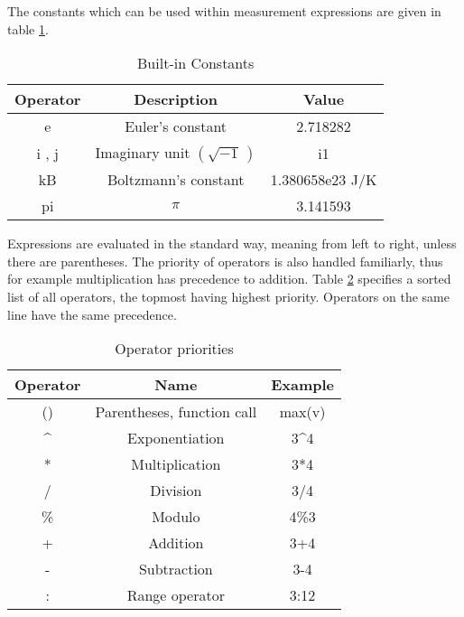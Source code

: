
The constants which can be used within measurement expressions are
given in table \ref{table:constants}.

%
\begin{table}[ht]
\begin{center}\begin{tabular}{|c|c|c|}
\hline 
Operator&
Description&
Value\tabularnewline
\hline
\hline 
e&
Euler's constant&
2.718282\tabularnewline
\hline 
i , j&
Imaginary unit $\left(\sqrt{-1}\,\right)$&
i1\tabularnewline
\hline 
kB&
Boltzmann's constant&
1.380658e23 J/K\tabularnewline
\hline 
pi&
$\pi$&
3.141593\tabularnewline
\hline
\end{tabular}\end{center}


\caption{\noindent \label{table:constants}Built-in Constants}
\end{table}






Expressions are evaluated in the standard way, meaning from left to
right, unless there are parentheses. The priority of operators is
also handled familiarly, thus for example multiplication has precedence
to addition. Table \ref{table:operators} specifies a sorted list
of all operators, the topmost having highest priority. Operators on
the same line have the same precedence.

%
\begin{table}[ht]
\begin{center}\begin{tabular}{|c|c|c|}
\hline 
Operator&
Name&
Example\tabularnewline
\hline
\hline 
()&
Parentheses, function call&
max(v)\tabularnewline
\hline 
\textasciicircum{}&
Exponentiation&
3\textasciicircum{}4\tabularnewline
\hline 
{*}&
Multiplication&
3{*}4\tabularnewline
/&
Division&
3/4\tabularnewline
\%&
Modulo&
4\%3\tabularnewline
\hline 
+&
Addition&
3+4\tabularnewline
-&
Subtraction&
3-4\tabularnewline
\hline 
:&
Range operator&
3:12\tabularnewline
\hline
\end{tabular}\end{center}


\caption{\label{table:operators}Operator priorities}
\end{table}




